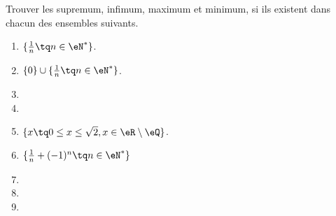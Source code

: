 

\begin{exercice}\label{exoSerieUn0008}

	Trouver les supremum, infimum, maximum et minimum, si ils existent dans chacun des ensembles suivants.
	\begin{enumerate}

		\item
			$\{ \frac{1}{ n }\tq n\in\eN^* \}$.
		\item
			$\{ 0 \}\cup\{ \frac{1}{ n }\tq n\in\eN^* \}$.
		\item
		\item
		\item
			$\{ x\tq 0\leq x\leq\sqrt{2}, x\in\eR\setminus\eQ \}$.
		\item
			$\{ \frac{1}{ n }+(-1)^n\tq n\in\eN^* \}$
		\item
		\item
		\item

	\end{enumerate}

\end{exercice}

